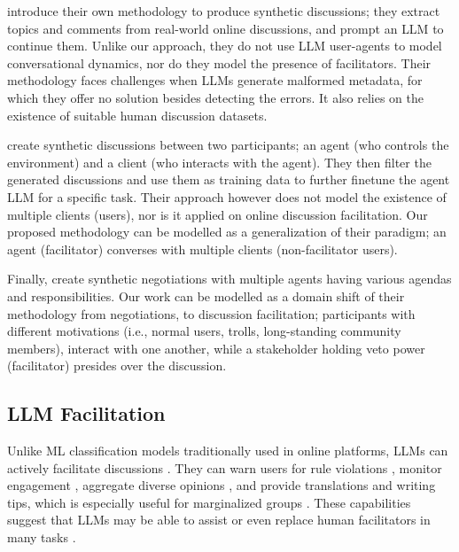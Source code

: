 \citet{balog_2024} introduce their own methodology to produce synthetic discussions; they extract topics and comments from real-world online discussions, and prompt an \ac{LLM} to continue them. Unlike our approach, they do not use \ac{LLM} user-agents to model conversational dynamics, nor do they model the presence of facilitators. Their methodology faces challenges when \acp{LLM} generate malformed metadata, for which they offer no solution besides detecting the errors. It also relies on the existence of suitable human discussion datasets.

\citet{ulmer2024} create synthetic discussions between two participants; an agent (who controls the environment) and a client (who interacts with the agent). They then filter the generated discussions and use them as training data to further finetune the agent \ac{LLM} for a specific task. Their approach however does not model the existence of multiple clients (users), nor is it applied on online discussion facilitation. Our proposed methodology can be modelled as a generalization of their paradigm; an agent (facilitator) converses with multiple clients (non-facilitator users).

Finally, \citet{abdelnabi_negotiations} create synthetic negotiations with multiple agents having various agendas and responsibilities. Our work can be modelled as a domain shift of their methodology from negotiations, to discussion facilitation; participants with different motivations (i.e., normal users, trolls, long-standing community members), interact with one another, while a stakeholder holding veto power (facilitator) presides over the discussion.


\subsection{LLM Facilitation}

Unlike \ac{ML} classification models traditionally used in online platforms, \acp{LLM} can actively facilitate discussions \cite{korre2025evaluation}. They can warn users for rule violations \cite{Kumar_AbuHashem_Durumeric_2024}, monitor engagement \cite{schroeder-etal-2024-fora}, aggregate diverse opinions \cite{small-polis-llm}, and provide translations and writing tips, which is especially useful for marginalized groups \cite{Tsai2024Generative}. These capabilities suggest that \acp{LLM} may be able to assist or even replace human facilitators in many tasks \cite{small-polis-llm, seering_self_moderation}.

